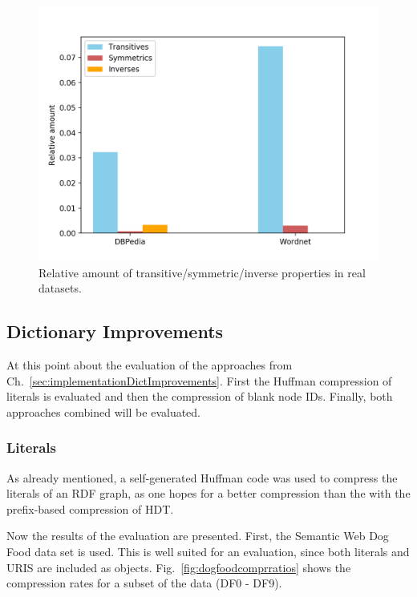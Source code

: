 \begin{figure}
	\centering
	\includegraphics[width=0.7\linewidth]{figures/4_evaluation/ontOccurrences}
	\caption{Relative amount of transitive/symmetric/inverse properties in real datasets.}
	\label{fig:ontoccurrences}
\end{figure}




\subsection{Dictionary Improvements}\label{sec:evaluationDictImprovements}

At this point  about the evaluation of the approaches from Ch.~\ref{sec:implementationDictImprovements}. First the Huffman compression of literals is evaluated and then the compression of blank node IDs. Finally, both approaches combined will be evaluated.


\subsubsection{Literals}

As already mentioned, a self-generated Huffman code was used to compress the literals of an RDF graph, as one hopes for a better compression than the with the prefix-based compression of HDT.

Now the results of the evaluation are presented. First, the Semantic Web Dog Food data set is used. This is well suited for an evaluation, since both literals and URIS are included as objects. Fig.~\ref{fig:dogfoodcomprratios} shows the compression rates for a subset of the data (DF0 - DF9). 


